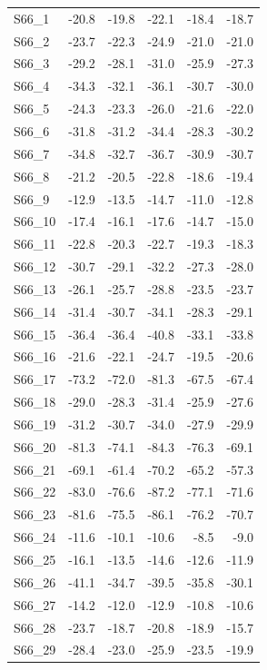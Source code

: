 \begin{longtable}{lrrrrr}
S66\_1 & -20.8 & -19.8 & -22.1 & -18.4 & -18.7 \\
S66\_2 & -23.7 & -22.3 & -24.9 & -21.0 & -21.0 \\
S66\_3 & -29.2 & -28.1 & -31.0 & -25.9 & -27.3 \\
S66\_4 & -34.3 & -32.1 & -36.1 & -30.7 & -30.0 \\
S66\_5 & -24.3 & -23.3 & -26.0 & -21.6 & -22.0 \\
S66\_6 & -31.8 & -31.2 & -34.4 & -28.3 & -30.2 \\
S66\_7 & -34.8 & -32.7 & -36.7 & -30.9 & -30.7 \\
S66\_8 & -21.2 & -20.5 & -22.8 & -18.6 & -19.4 \\
S66\_9 & -12.9 & -13.5 & -14.7 & -11.0 & -12.8 \\
S66\_10 & -17.4 & -16.1 & -17.6 & -14.7 & -15.0 \\
S66\_11 & -22.8 & -20.3 & -22.7 & -19.3 & -18.3 \\
S66\_12 & -30.7 & -29.1 & -32.2 & -27.3 & -28.0 \\
S66\_13 & -26.1 & -25.7 & -28.8 & -23.5 & -23.7 \\
S66\_14 & -31.4 & -30.7 & -34.1 & -28.3 & -29.1 \\
S66\_15 & -36.4 & -36.4 & -40.8 & -33.1 & -33.8 \\
S66\_16 & -21.6 & -22.1 & -24.7 & -19.5 & -20.6 \\
S66\_17 & -73.2 & -72.0 & -81.3 & -67.5 & -67.4 \\
S66\_18 & -29.0 & -28.3 & -31.4 & -25.9 & -27.6 \\
S66\_19 & -31.2 & -30.7 & -34.0 & -27.9 & -29.9 \\
S66\_20 & -81.3 & -74.1 & -84.3 & -76.3 & -69.1 \\
S66\_21 & -69.1 & -61.4 & -70.2 & -65.2 & -57.3 \\
S66\_22 & -83.0 & -76.6 & -87.2 & -77.1 & -71.6 \\
S66\_23 & -81.6 & -75.5 & -86.1 & -76.2 & -70.7 \\
S66\_24 & -11.6 & -10.1 & -10.6 & -8.5 & -9.0 \\
S66\_25 & -16.1 & -13.5 & -14.6 & -12.6 & -11.9 \\
S66\_26 & -41.1 & -34.7 & -39.5 & -35.8 & -30.1 \\
S66\_27 & -14.2 & -12.0 & -12.9 & -10.8 & -10.6 \\
S66\_28 & -23.7 & -18.7 & -20.8 & -18.9 & -15.7 \\
S66\_29 & -28.4 & -23.0 & -25.9 & -23.5 & -19.9 \\

\end{longtable}
